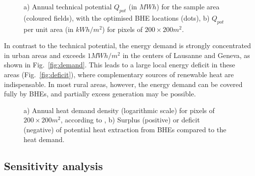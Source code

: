 \begin{figure}[tb]
\centering
{}
\caption{a) Annual technical potential $Q_{pot}$ (in $MWh$) for the sample area (coloured fields), with the optimised BHE locations (dots), b) $Q_{pot}$ per unit area (in $kWh/m^2$) for pixels of $200 \times 200m^2$.} 
\label{fig:Q_pot}
\end{figure}

In contrast to the technical potential, the energy demand is strongly concentrated in urban areas and exceeds $1 MWh/m^2$ in the centers of Lausanne and Geneva, as shown in Fig.~\ref{fig:demand}. 
This leads to a large local energy deficit in these areas (Fig.~\ref{fig:deficit}), where complementary sources of renewable heat are indispensable.
In most rural areas, however, the energy demand can be covered fully by BHEs, and partially excess generation may be possible. 

\begin{figure}[tb]
\centering
{}
\caption{a) Annual heat demand density (logarithmic scale) for pixels of $200 \times 200m^2$, according to \citet{schneider_spatialtemporal_2017}, b) Surplus (positive) or deficit (negative) of potential heat extraction from BHEs compared to the heat demand.}
\label{fig:demand_cover}
\end{figure}

\subsection{Sensitivity analysis}

